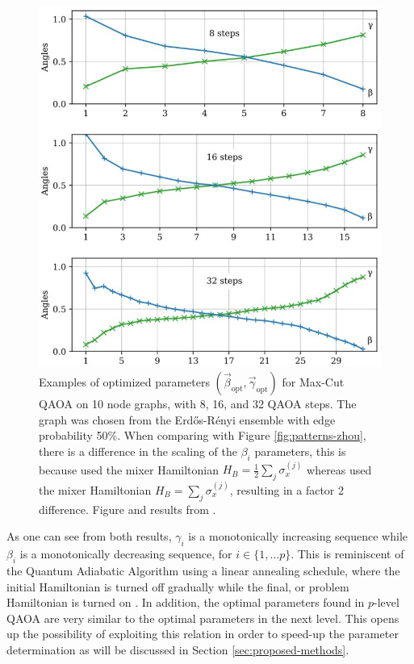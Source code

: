 \begin{figure}[H]
	\centering
	\includegraphics[scale=0.5]{figures/patterns-crooks.jpg}
	\caption{Examples of optimized parameters $(\vec{\beta}_{\text{opt}}, \vec{\gamma}_{\text{opt}})$ for Max-Cut QAOA on 10 node graphs, with 8, 16, and 32 QAOA	steps. The graph was chosen from the Erd\H{o}s-R\'enyi ensemble with edge probability 50\%.  When comparing with Figure \ref{fig:patterns-zhou}, there is a difference in the scaling of the $\beta_i$ parameters, this is because \cite{Crooks18} used the mixer Hamiltonian $H_B = \frac{1}{2}\sum_j \sigma_x^{(j)}$ whereas \cite{ZWCPL18} used the mixer Hamiltonian $H_B = \sum_j \sigma_x^{(j)}$, resulting in a factor 2 difference. Figure and results from \cite{Crooks18}.}
	\label{fig:patterns-crooks}
\end{figure}

As one can see from both results, $\gamma_i$ is a monotonically increasing sequence while $\beta_i$ is a monotonically decreasing sequence, for $i \in \{1, \dots p\}$. This is reminiscent of the Quantum Adiabatic Algorithm using a linear annealing schedule, where the initial Hamiltonian is turned off gradually while the final, or problem Hamiltonian is turned on \cite{AL18}. In addition, the optimal parameters found in $p$-level QAOA are very similar to the optimal parameters in the next level. This opens up the possibility of exploiting this relation in order to speed-up the parameter determination as will be discussed in Section \ref{sec:proposed-methods}.
	
